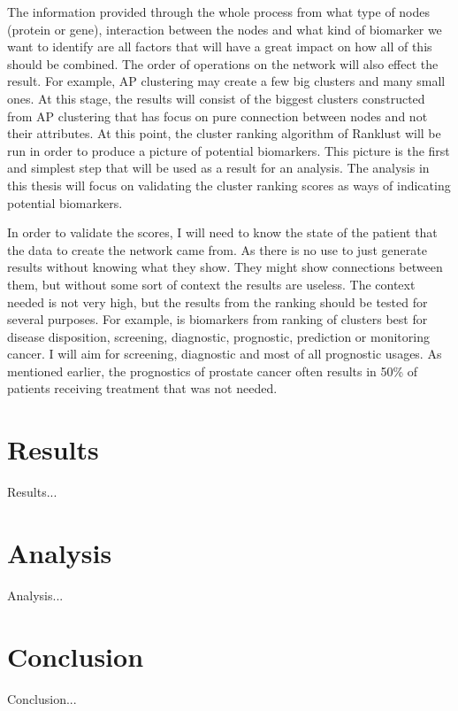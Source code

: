 \documentclass[UKenglish]{ifimaster}
\begin{document}
The information provided through the whole process from what type of nodes (protein or gene), interaction between the
nodes and what kind of biomarker we want to identify are all factors that will have a great impact on how all of this
should be combined. The order of operations on the network will also effect the result. For example, AP clustering may
create a few big clusters and many small ones. At this stage, the results will consist of the biggest clusters
constructed from AP clustering that has focus on pure connection between nodes and not their attributes. At this point,
the cluster ranking algorithm of Ranklust will be run in order to produce a picture of potential biomarkers. This
picture is the first and simplest step that will be used as a result for an analysis. The analysis in this thesis will
focus on validating the cluster ranking scores as ways of indicating potential biomarkers. 

In order to validate the scores, I will need to know the state of the patient that the data to create the network came
from. As there is no use to just generate results without knowing what they show. They might show connections between
them, but without some sort of context the results are useless. The context needed is not very high, but the results
from the ranking should be tested for several purposes. For example, is biomarkers from ranking of clusters best for
disease disposition, screening, diagnostic, prognostic, prediction or monitoring cancer. I will aim for screening,
diagnostic and most of all prognostic usages. As mentioned earlier, the prognostics of prostate cancer often results in
50\% of patients receiving treatment that was not needed.

\part{Results}
Results...
\part{Analysis}
Analysis...
\part{Conclusion}
Conclusion...
\backmatter{}
\printbibliography
\end{document}
